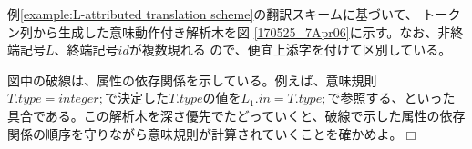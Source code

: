 \begin{example}
 例\ref{example:L-attributed translation scheme}の翻訳スキームに基づいて、
 トークン列から生成した意味動作付き解析木を図
 \ref{170525_7Apr06}に示す。なお、非終端記号$L$、終端記号$id$が複数現れる
 ので、便宜上添字を付けて区別している。

 図中の破線は、属性の依存関係を示している。例えば、意味規則$T.type =
 integer;$で決定した$T.type$の値を$L_1.in = T.type;$で参照する、といった
 具合である。この解析木を深さ優先でたどっていくと、破線で示した属性の依存
 関係の順序を守りながら意味規則が計算されていくことを確かめよ。$\Box$
\end{example}







